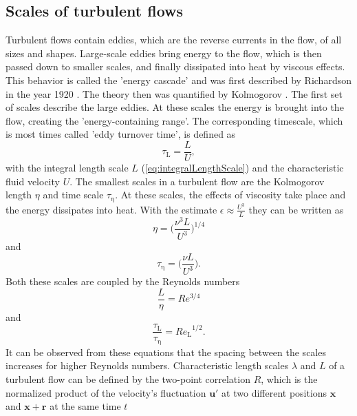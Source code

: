 \documentclass[11pt,a4paper,openany,oneside,parskip=half*]{article}
\renewcommand*\vec[1]{\boldsymbol{#1}}
\begin{document}
\subsection{Scales of turbulent flows}
Turbulent flows contain eddies, which are the reverse currents in the flow, of all sizes and shapes. Large-scale eddies bring energy to the flow, which is then passed down to smaller scales, and finally dissipated into heat by viscous effects. This behavior is called the 'energy cascade' and was first described by Richardson in the year 1920 \cite{Richardson1920}. The theory then was quantified by Kolmogorov \cite{Kolmogorov1941}.
\newline
The first set of scales describe the large eddies. At these scales the energy is brought into the flow, creating the 'energy-containing range'. The corresponding timescale, which is most times called 'eddy turnover time', is defined as
\begin{equation}
\tau_\mathrm{L} = \frac{L}{U},
\end{equation}
with the integral length scale $L$ (\ref{eq:integralLengthScale}) and the characteristic fluid velocity $U$.
\newline
The smallest scales in a turbulent flow are the Kolmogorov length $\eta$ and time scale $\tau_\mathrm{\eta}$. At these scales, the effects of viscosity take place and the energy dissipates into heat. With the estimate $\epsilon \approx \frac{U^3}{L} $ they can be written as
\begin{equation}
\eta = \biggl (\frac{\nu^3 L}{U^3} \biggl )^{1/4}
\end{equation}
and
\begin{equation}
\tau_\mathrm{\eta} = \biggl (\frac{\nu L}{U^3} \biggl ).
\end{equation}
Both these scales are coupled by the Reynolds numbers
\begin{equation}
\frac{L}{\eta} = Re^{3/4}
\end{equation}
and
\begin{equation}
\frac{\tau_\mathrm{L}}{\tau_\mathrm{\eta}} = {Re_\mathrm{L}}^{1/2}.
\end{equation}
It can be observed from these equations that the spacing between the scales increases for higher Reynolds numbers. 
\newline
Characteristic length scales $\lambda$ and $L$ of a turbulent flow can be defined by the two-point correlation $R$, which is the normalized product of the velocity's fluctuation $\vec{u'}$ at two different positions 
$\vec{x}$ and $\vec{x} + \vec{r}$ at the same time $t$
\end{document}
